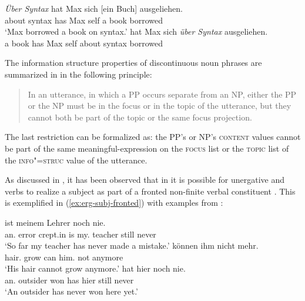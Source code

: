 \documentclass[output=paper]{langsci/langscibook}
\begin{document}
\begin{exe}
  \ex\label{ex:np-pp} \begin{xlist}
    \ex\label{ex:simple-fronted-pp}\gll \textsl{Über Syntax} hat Max sich [ein
 Buch] ausgeliehen.\\
         {about syntax} has Max self { a} book borrowed\\
       \trans `Max borrowed a book on syntax.'
    \ex\label{ex:simple-fronted-np} hat Max sich \textsl{über Syntax}    ausgeliehen.\\
 { a} book has Max self {about syntax} borrowed\\
\end{xlist}
\end{exe}

The information structure properties of discontinuous noun phrases are
summarized in \citet[176]{deKuthy2002a} in the following principle:
\begin{quote}
  In an utterance, in which a PP occurs separate from an NP, either
  the PP or the NP must be in the focus or in the topic of the
  utterance, but they cannot both be part of the topic or the same
  focus projection. \citep[176]{deKuthy2002a}
\end{quote}

The last restriction can be formalized as: the PP's or NP's
\textsc{content} values cannot be part of the same
meaningful-expression on the \textsc{focus} list or the \textsc{topic}
list of the \textsc{info"=struc} value of the utterance.

As discussed in \cite{dKM2003a}, it has been observed that in
 it is possible for unergative and  verbs to
realize a subject as part of a fronted non-finite verbal
constituent \citep{Haider90-ohne-crossref}. This is exemplified in (\ref{ex:erg-subj-fronted}) with examples from \citet[94]{Haider90-ohne-crossref}:

\begin{exe}
\ex\label{ex:erg-subj-fronted}
  \begin{xlist}
  \ex\label{ex:erg-subj-fronted-indef} ist meinem Lehrer noch nie.\\
         {\LB}an.\nom{} error {crept.in} is my.\dat{} teacher still never\\
         \trans `So far my teacher has never made a mistake.'
  \ex{} können ihm nicht mehr.\\
          {\LB}hair.\nom{} grow can him.\dat{} not anymore\\
          \trans `His hair cannot grow anymore.'
\ex\label{ex:nonerg-subj-fronted}
       hat hier noch nie.\\
           {\LB}an.\nom{} outsider won has hier still never\\
        \trans `An outsider has never won here yet.' 
  \end{xlist}
\end{exe}
\end{document}
